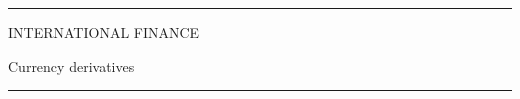 \documentclass[12pt,aspectratio=169]{beamer}
\begin{document}
\begin{frame}

\begin{center}

\rule{\textwidth}{2pt}

\vskip3mm
INTERNATIONAL FINANCE

Currency derivatives
\rule{\textwidth}{2pt}

\end{center}

\end{frame}


\end{document}
